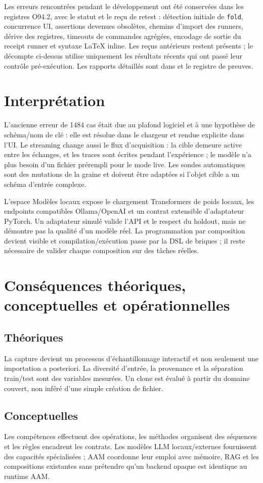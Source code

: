 \documentclass[11pt,a4paper]{article}
\begin{document}
Les erreurs rencontrées pendant le développement ont été conservées dans les registres O94.2, avec le statut et le reçu de retest : détection initiale de \verb|fold|, concurrence UI, assertions devenues obsolètes, chemins d'import des runners, dérive des registres, timeouts de commandes agrégées, encodage de sortie du receipt runner et syntaxe LaTeX inline. Les reçus antérieurs restent présents ; le décompte ci-dessus utilise uniquement les résultats récents qui ont passé leur contrôle pré-exécution. Les rapports détaillés sont dans  et le registre de preuves.

\section{Interprétation}
L'ancienne erreur de 1484 cas était due au plafond logiciel et à une hypothèse de schéma/nom de clé : elle est résolue dans le chargeur et rendue explicite dans l'UI. Le streaming change aussi le flux d'acquisition : la cible demeure active entre les échanges, et les traces sont écrites pendant l'expérience ; le modèle n'a plus besoin d'un fichier prérempli pour le mode live. Les sondes automatiques sont des mutations de la graine et doivent être adaptées si l'objet cible a un schéma d'entrée complexe.

L'espace Modèles locaux expose le chargement Transformers de poids locaux, les endpoints compatibles Ollama/OpenAI et un contrat extensible d'adaptateur PyTorch. Un adaptateur simulé valide l'API et le respect du holdout, mais ne démontre pas la qualité d'un modèle réel. La programmation par composition devient visible et compilation/exécution passe par la DSL de briques ; il reste nécessaire de valider chaque composition sur des tâches réelles.

\section{Conséquences théoriques, conceptuelles et opérationnelles}
\subsection{Théoriques}
La capture devient un processus d'échantillonnage interactif et non seulement une importation a posteriori. La diversité d'entrée, la provenance et la séparation train/test sont des variables mesurées. Un clone est évalué à partir du domaine couvert, non inféré d'une simple création de fichier.
\subsection{Conceptuelles}
Les compétences effectuent des opérations, les méthodes organisent des séquences et les règles encadrent les contrats. Les modèles LLM locaux/externes fournissent des capacités spécialisées ; AAM coordonne leur emploi avec mémoire, RAG et les compositions existantes sans prétendre qu'un backend opaque est identique au runtime AAM.
\end{document}
